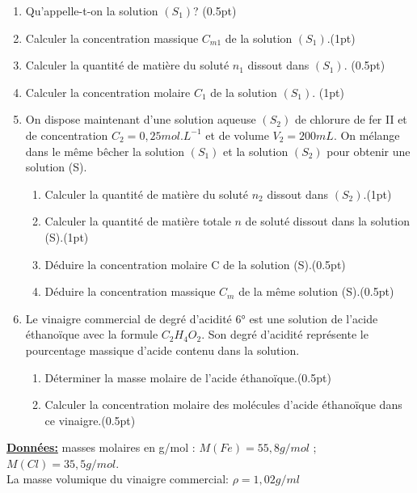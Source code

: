 \documentclass[12pt]{article}
\begin{document}
\begin{enumerate}
    \item Qu’appelle-t-on la solution $(S_1)$? \dotfill(0.5pt)
    \item Calculer la concentration massique $C_{m1}$ de la solution $(S_1)$.\dotfill(1pt)
    \item Calculer la quantité de matière du soluté $n_1$ dissout dans $(S_1)$. \dotfill(0.5pt)
    \item Calculer la concentration molaire $C_1$ de la solution $(S_1)$. \dotfill(1pt)
    \item On dispose maintenant d’une solution aqueuse $(S_2)$ de chlorure de fer II et de concentration $C_2=0,25mol.L^{-1}$ et de volume $V_2 = 200 mL$. On mélange dans le même bêcher la solution $(S_1)$ et la solution $(S_2)$ pour obtenir une solution (S).
        \begin{enumerate}
            \item  Calculer la quantité de matière du soluté $n_2$ dissout dans $(S_2)$.\dotfill(1pt)
            \item Calculer la quantité de matière totale $n$ de soluté dissout dans la solution (S).\dotfill(1pt)
            \item Déduire la concentration molaire C de la solution (S).\dotfill(0.5pt)
            \item Déduire la concentration massique $C_m$ de la même solution (S).\dotfill(0.5pt)
        \end{enumerate}
    \item Le vinaigre commercial de degré d'acidité 6° est une solution de l'acide éthanoïque avec la formule
$C_2H_4O_2$. Son degré d'acidité représente le pourcentage massique d'acide contenu dans la solution.
        \begin{enumerate}
            \item Déterminer la masse molaire de l'acide éthanoïque.\dotfill(0.5pt)
            \item Calculer la concentration molaire des molécules d'acide éthanoïque dans ce vinaigre.\dotfill(0.5pt)
        \end{enumerate}
\end{enumerate}
\textbf{\underline{Données:} }
masses molaires en g/mol : $M(Fe) = 55,8g/mol$ ; $M(Cl)= 35,5g/mol$.
\\La masse volumique du vinaigre commercial: $\rho = 1,02 g/ml$

\end{document}
